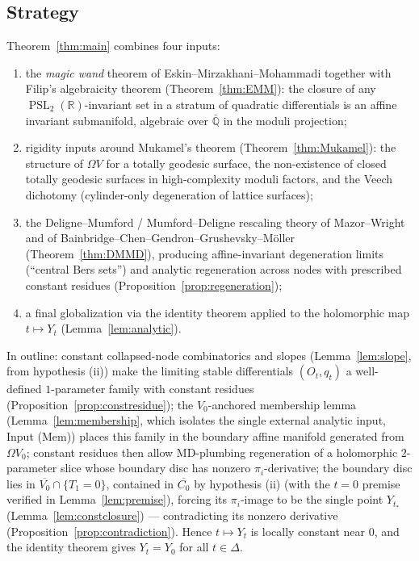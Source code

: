 \documentclass[11pt]{article}
\newcommand{\R}{\mathbb{R}}
\DeclareMathOperator{\PSL}{PSL}
\theoremstyle{definition}
\theoremstyle{remark}
\begin{document}
\subsection{Strategy}
Theorem~\ref{thm:main} combines four inputs:
\begin{enumerate}[label=(\alph*)]
\item the \emph{magic wand} theorem of Eskin--Mirzakhani--Mohammadi together
with Filip's algebraicity theorem (Theorem~\ref{thm:EMM}): the closure of
any $\PSL_2(\R)$-invariant set in a stratum of quadratic differentials is an
affine invariant submanifold, algebraic over $\bar{\mathbb{Q}}$ in the moduli
projection;
\item rigidity inputs around Mukamel's theorem
(Theorem~\ref{thm:Mukamel}): the structure of $\Omega V$ for a totally
geodesic surface, the non-existence of closed totally geodesic surfaces
in high-complexity moduli factors, and the Veech dichotomy
(cylinder-only degeneration of lattice surfaces);
\item the Deligne--Mumford / Mumford--Deligne rescaling theory of
Mazor--Wright and of Bainbridge--Chen--Gendron--Grushevsky--M\"oller
(Theorem~\ref{thm:DMMD}), producing affine-invariant degeneration limits
(``central Bers sets'') and analytic regeneration across nodes with
prescribed constant residues (Proposition~\ref{prop:regeneration});
\item a final globalization via the identity theorem applied to the
holomorphic map $t \mapsto Y_t$ (Lemma~\ref{lem:analytic}).
\end{enumerate}
In outline: constant collapsed-node combinatorics and slopes
(Lemma~\ref{lem:slope}, from hypothesis (ii)) make the limiting stable
differentials $(O_t,q_t)$ a well-defined $1$-parameter family with
constant residues (Proposition~\ref{prop:constresidue}); the $V_0$-anchored
membership lemma (Lemma~\ref{lem:membership}, which isolates the single
external analytic input, Input (Mem)) places this family in the boundary
affine manifold generated from $\Omega V_0$; constant residues then allow
MD-plumbing regeneration of a holomorphic $2$-parameter slice whose
boundary disc has nonzero $\pi_i$-derivative; the boundary disc lies in
$\overline{V_0}\cap\{T_1 = 0\}$, contained in $\overline{C_0}$ by
hypothesis (ii) (with the $t=0$ premise verified in
Lemma~\ref{lem:premise}), forcing its $\pi_i$-image to be the single
point $Y_{t_*}$ (Lemma~\ref{lem:constclosure}) --- contradicting its
nonzero derivative (Proposition~\ref{prop:contradiction}). Hence
$t \mapsto Y_t$ is locally constant near $0$, and the identity theorem
gives $Y_t = Y_0$ for all $t \in \Delta$.
\end{document}
